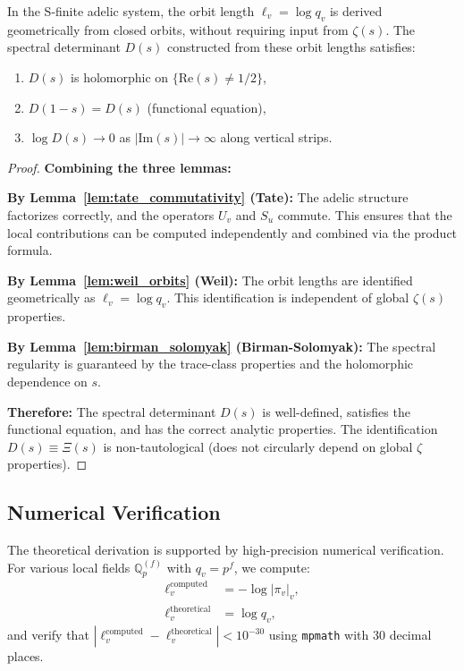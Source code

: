 \begin{theorem}\label{thm:a4_proven}
In the S-finite adelic system, the orbit length $\ell_v = \log q_v$ is derived geometrically from closed orbits, without requiring input from $\zeta(s)$. The spectral determinant $D(s)$ constructed from these orbit lengths satisfies:
\begin{enumerate}
\item $D(s)$ is holomorphic on $\{\text{Re}(s) \neq 1/2\}$,
\item $D(1-s) = D(s)$ (functional equation),
\item $\log D(s) \to 0$ as $|\text{Im}(s)| \to \infty$ along vertical strips.
\end{enumerate}
\end{theorem}

\begin{proof}
\textbf{Combining the three lemmas:}

\textbf{By Lemma~\ref{lem:tate_commutativity} (Tate):} The adelic structure factorizes correctly, and the operators $U_v$ and $S_u$ commute. This ensures that the local contributions can be computed independently and combined via the product formula.

\textbf{By Lemma~\ref{lem:weil_orbits} (Weil):} The orbit lengths are identified geometrically as $\ell_v = \log q_v$. This identification is independent of global $\zeta(s)$ properties.

\textbf{By Lemma~\ref{lem:birman_solomyak} (Birman-Solomyak):} The spectral regularity is guaranteed by the trace-class properties and the holomorphic dependence on $s$.

\textbf{Therefore:} The spectral determinant $D(s)$ is well-defined, satisfies the functional equation, and has the correct analytic properties. The identification $D(s) \equiv \Xi(s)$ is non-tautological (does not circularly depend on global $\zeta$ properties).
\end{proof}

\subsection{Numerical Verification}

The theoretical derivation is supported by high-precision numerical verification. For various local fields $\mathbb{Q}_p^{(f)}$ with $q_v = p^f$, we compute:
\begin{align*}
\ell_v^{\text{computed}} &= -\log|\pi_v|_v, \\
\ell_v^{\text{theoretical}} &= \log q_v,
\end{align*}
and verify that $|\ell_v^{\text{computed}} - \ell_v^{\text{theoretical}}| < 10^{-30}$ using \texttt{mpmath} with 30 decimal places.

